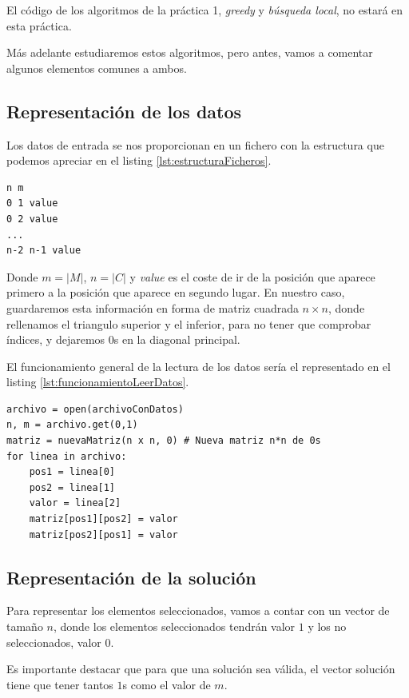 El código de los algoritmos de la práctica 1, \textit{greedy} y \textit{búsqueda local}, no estará en esta práctica.

Más adelante estudiaremos estos algoritmos, pero antes, vamos a comentar algunos elementos comunes a ambos.

\subsection{Representación de los datos}

Los datos de entrada se nos proporcionan en un fichero con la estructura que podemos apreciar en el listing \ref{lst:estructuraFicheros}.

\begin{lstlisting}[frame=single,caption={Estructura de los ficheros proporcionados},label=lst:estructuraFicheros, captionpos=b]
n m
0 1 value
0 2 value
...
n-2 n-1 value
\end{lstlisting}

Donde $m = |M|$, $n = |C|$ y \textit{value} es el coste de ir de la posición que aparece primero a la posición que aparece en segundo lugar. En nuestro caso, guardaremos esta información en forma de matriz cuadrada $n \times n$, donde rellenamos el triangulo superior y el inferior, para no tener que comprobar índices, y dejaremos 0s en la diagonal principal.

El funcionamiento general de la lectura de los datos sería el representado en el listing \ref{lst:funcionamientoLeerDatos}.

\begin{lstlisting}[frame=single, caption={Generalización de la lectura de los datos},label=lst:funcionamientoLeerDatos, captionpos=b]
archivo = open(archivoConDatos)
n, m = archivo.get(0,1)
matriz = nuevaMatriz(n x n, 0) # Nueva matriz n*n de 0s
for linea in archivo:
    pos1 = linea[0]
    pos2 = linea[1]
    valor = linea[2]
    matriz[pos1][pos2] = valor
    matriz[pos2][pos1] = valor
\end{lstlisting}


\subsection{Representación de la solución}

Para representar los elementos seleccionados, vamos a contar con un vector de tamaño $n$, donde los elementos seleccionados tendrán valor $1$ y los no seleccionados, valor $0$.

Es importante destacar que para que una solución sea válida, el vector solución tiene que tener tantos $1$s como el valor de $m$.

